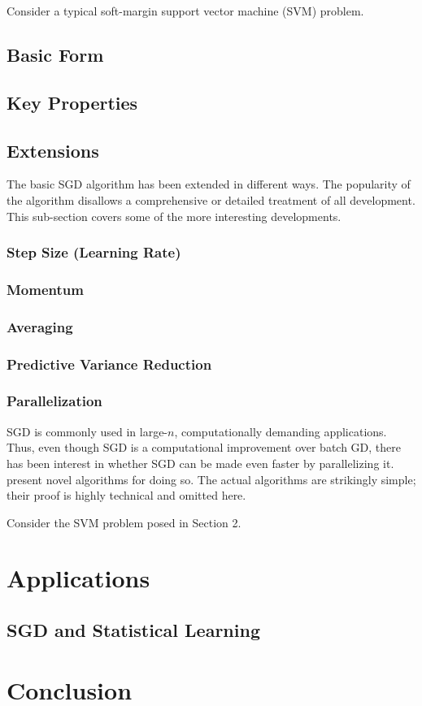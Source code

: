 \documentclass{article}
\begin{document}
Consider a typical soft-margin support vector machine (SVM) problem.

\subsection{Basic Form}

\cite{bottou2010large}
\cite{bottou2012stochastic}
\cite{boyd2004convex}
\cite{dal2015calibrating}

\subsection{Key Properties}

\subsection{Extensions}

The basic SGD algorithm has been extended in different ways. The popularity of
the algorithm disallows a comprehensive or detailed treatment of all
development. This sub-section covers some of the more interesting developments.

\subsubsection{Step Size (Learning Rate)}

\cite{shalev2011pegasos}

\subsubsection{Momentum}

\subsubsection{Averaging}

\subsubsection{Predictive Variance Reduction}

\subsubsection{Parallelization}

SGD is commonly used in large-$n$, computationally demanding applications. Thus,
even though SGD is a computational improvement over batch GD, there has been
interest in whether SGD can be made even faster by parallelizing it.
\cite{zinkevich2010parallelized} present novel algorithms for doing so. The
actual algorithms are strikingly simple; their proof is highly technical and
omitted here.

Consider the SVM problem posed in Section 2.


\section{Applications}

\subsection{SGD and Statistical Learning}

\section{Conclusion}

\printbibliography
\end{document}
